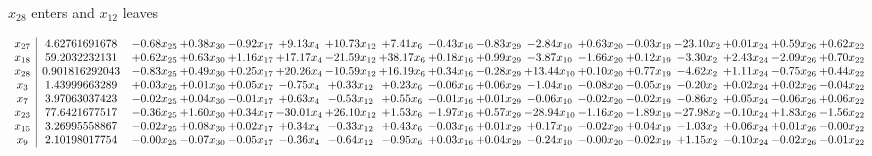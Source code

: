 \documentclass[9pt]{article}
\begin{document}
 $ x_{28} $ enters and $ x_{12} $ leaves 

 \[\begin{array}{c| c c@{\hskip 2pt} c@{\hskip 2pt} c@{\hskip 2pt} c@{\hskip 2pt} c@{\hskip 2pt} c@{\hskip 2pt} c@{\hskip 2pt} c@{\hskip 2pt} c@{\hskip 2pt} c@{\hskip 2pt} c@{\hskip 2pt} c@{\hskip 2pt} c@{\hskip 2pt} c@{\hskip 2pt} c@{\hskip 2pt} }
 x_{27}   &  4.62761691678 & -0.68 x_{25} & +  0.38 x_{30} & -0.92 x_{17} & +  9.13 x_{4} & + 10.73 x_{12} & +  7.41 x_{6} & -0.43 x_{16} & -0.83 x_{29} & -2.84 x_{10} & +  0.63 x_{20} & -0.03 x_{19} & -23.10 x_{2} & +  0.01 x_{24} & +  0.59 x_{26} & +  0.62 x_{22}\\
 x_{18}   &  59.2032232131 & +  0.62 x_{25} & +  0.63 x_{30} & +  1.16 x_{17} & + 17.17 x_{4} & -21.59 x_{12} & + 38.17 x_{6} & +  0.18 x_{16} & +  0.99 x_{29} & -3.87 x_{10} & -1.66 x_{20} & +  0.12 x_{19} & -3.30 x_{2} & +  2.43 x_{24} & -2.09 x_{26} & +  0.70 x_{22}\\
 x_{28}   &  0.901816292043 & -0.83 x_{25} & +  0.49 x_{30} & +  0.25 x_{17} & + 20.26 x_{4} & -10.59 x_{12} & + 16.19 x_{6} & +  0.34 x_{16} & -0.28 x_{29} & + 13.44 x_{10} & +  0.10 x_{20} & +  0.77 x_{19} & -4.62 x_{2} & +  1.11 x_{24} & -0.75 x_{26} & +  0.44 x_{22}\\
 x_{3}   &  1.43999663289 & +  0.03 x_{25} & +  0.01 x_{30} & +  0.05 x_{17} & -0.75 x_{4} & +  0.33 x_{12} & +  0.23 x_{6} & -0.06 x_{16} & +  0.06 x_{29} & -1.04 x_{10} & -0.08 x_{20} & -0.05 x_{19} & -0.20 x_{2} & +  0.02 x_{24} & +  0.02 x_{26} & -0.04 x_{22}\\
 x_{7}   &  3.97063037423 & -0.02 x_{25} & +  0.04 x_{30} & -0.01 x_{17} & +  0.63 x_{4} & -0.53 x_{12} & +  0.55 x_{6} & -0.01 x_{16} & +  0.01 x_{29} & -0.06 x_{10} & -0.02 x_{20} & -0.02 x_{19} & -0.86 x_{2} & +  0.05 x_{24} & -0.06 x_{26} & +  0.06 x_{22}\\
 x_{23}   &  77.6421677517 & -0.36 x_{25} & +  1.60 x_{30} & +  0.34 x_{17} & -30.01 x_{4} & + 26.10 x_{12} & +  1.53 x_{6} & -1.97 x_{16} & +  0.57 x_{29} & -28.94 x_{10} & -1.16 x_{20} & -1.89 x_{19} & -27.98 x_{2} & -0.10 x_{24} & +  1.83 x_{26} & -1.56 x_{22}\\
 x_{15}   &  3.26995558867 & -0.02 x_{25} & +  0.08 x_{30} & +  0.02 x_{17} & +  0.34 x_{4} & -0.33 x_{12} & +  0.43 x_{6} & -0.03 x_{16} & +  0.01 x_{29} & +  0.17 x_{10} & -0.02 x_{20} & +  0.04 x_{19} & -1.03 x_{2} & +  0.06 x_{24} & +  0.01 x_{26} & -0.00 x_{22}\\
 x_{9}   &  2.10198017754 & -0.00 x_{25} & -0.07 x_{30} & -0.05 x_{17} & -0.36 x_{4} & -0.64 x_{12} & -0.95 x_{6} & +  0.03 x_{16} & +  0.04 x_{29} & -0.24 x_{10} & -0.00 x_{20} & -0.02 x_{19} & +  1.15 x_{2} & -0.10 x_{24} & -0.02 x_{26} & -0.01 x_{22}\\

\end{array}\]
\end{document}
